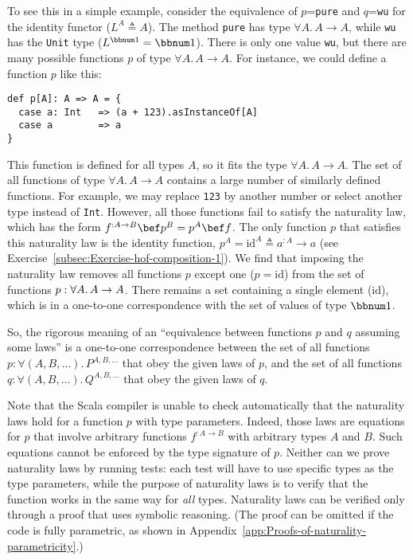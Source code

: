 To see this in a simple example, consider the equivalence of $p$=\lstinline!pure!
and $q$=\lstinline!wu! for the identity functor ($L^{A}\triangleq A$).
The method \lstinline!pure! has type $\forall A.\,A\rightarrow A$,
while \lstinline!wu! has the \lstinline!Unit! type ($L^{\bbnum 1}=\bbnum 1$).
There is only one value \lstinline!wu!, but there are many possible
functions $p$ of type $\forall A.\,A\rightarrow A$. For instance,
we could define a function $p$ like this:
\begin{lstlisting}
def p[A]: A => A = {
  case a: Int   => (a + 123).asInstanceOf[A]
  case a        => a
}
\end{lstlisting}
This function is defined for all types $A$, so it fits the type $\forall A.\,A\rightarrow A$.
The set of all functions of type $\forall A.\,A\rightarrow A$ contains
a large number of similarly defined functions. For example, we may
replace \lstinline!123! by another number or select another type
instead of \lstinline!Int!. However, all those functions fail to
satisfy the naturality law, which has the form $f^{:A\rightarrow B}\bef p^{B}=p^{A}\bef f$.
The only function $p$ that satisfies this naturality law is the identity
function, $p^{A}=\text{id}^{A}\triangleq a^{:A}\rightarrow a$ (see
Exercise~\ref{subsec:Exercise-hof-composition-1}). We find that
imposing the naturality law removes all functions $p$ except one
($p=\text{id}$) from the set of functions $p:\text{\ensuremath{\forall A.\,A\rightarrow A}}$.
There remains a set containing a single element ($\text{id}$), which
is in a one-to-one correspondence with the set of values of type $\bbnum 1$.

So, the rigorous meaning of an \textsf{``}equivalence between functions $p$
and $q$ assuming some laws\textsf{''} is a one-to-one correspondence between
the set of all functions $p:\forall(A,B,...).\,P^{A,B,...}$ that
obey the given laws of $p$, and the set of all functions $q:\forall(A,B,...).\,Q^{A,B,...}$
that obey the given laws of $q$.

Note that the Scala compiler is unable to check automatically that
the naturality laws hold for a function $p$ with type parameters.
Indeed, those laws are equations for $p$ that involve arbitrary functions
$f^{:A\rightarrow B}$ with arbitrary types $A$ and $B$. Such equations
cannot be enforced by the type signature of $p$. Neither can we prove
naturality laws by running tests: each test will have to use specific
types as the type parameters, while the purpose of naturality laws
is to verify that the function works in the same way for \emph{all}
types. Naturality laws can be verified only through a proof that uses
symbolic reasoning. (The proof can be omitted if the code is fully
parametric, as shown in Appendix~\ref{app:Proofs-of-naturality-parametricity}.)

